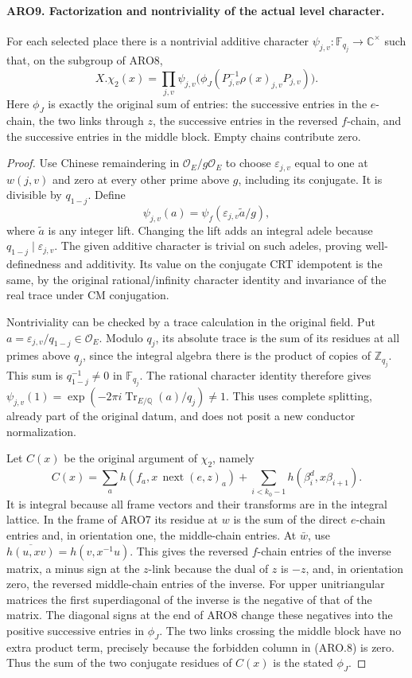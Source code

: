 \paragraph{ARO9. Factorization and nontriviality of the actual level character.}
\label{claim:ARO9}
For each selected place there is a nontrivial additive character
\(\psi_{j,v}:\mathbb F_{q_j}\to\mathbb C^\times\) such that, on
the subgroup of ARO8,
\[
 X.\chi_2(x)=\prod_{j,v}\psi_{j,v}
   \bigl(\phi_J(P_{j,v}^{-1}\rho(x)_{j,v}P_{j,v})\bigr).
 \tag{ARO.10}
\]
Here \(\phi_J\) is exactly the original sum of entries: the
successive entries in the \(e\)-chain, the two links through \(z\),
the successive entries in the reversed \(f\)-chain, and the
successive entries in the middle block.  Empty chains contribute zero.
\begin{proof}
Use Chinese remaindering in \(\mathcal O_E/g\mathcal O_E\) to
choose \(\varepsilon_{j,v}\) equal to one at \(w(j,v)\) and zero
at every other prime above \(g\), including its conjugate.
It is divisible by \(q_{1-j}\).  Define
\[
 \psi_{j,v}(a)=\psi_f(\varepsilon_{j,v}\widetilde a/g),
 \tag{ARO.11}
\]
where \(\widetilde a\) is any integer lift.  Changing the lift
adds an integral adele because \(q_{1-j}\mid\varepsilon_{j,v}\).
The given additive character is trivial on such adeles, proving
well-definedness and additivity.  Its value on the conjugate CRT
idempotent is the same, by the original rational/infinity character
identity and invariance of the real trace under CM conjugation.

Nontriviality can be checked by a trace calculation in the original
field.  Put \(a=\varepsilon_{j,v}/q_{1-j}\in\mathcal O_E\).
Modulo \(q_j\), its absolute trace is the sum of its residues at
all primes above \(q_j\), since the integral algebra there is the
product of copies of \(\mathbb Z_{q_j}\).  This sum is
\(q_{1-j}^{-1}\neq0\) in \(\mathbb F_{q_j}\).  The rational
character identity therefore gives
\(\psi_{j,v}(1)=\exp(-2\pi i\operatorname{Tr}_{E/\mathbb Q}(a)/q_j)
\neq1\).  This uses complete splitting, already part of the
original datum, and does not posit a new conductor normalization.

Let \(C(x)\) be the original argument of \(\chi_2\), namely
\[
 C(x)=\sum_a h(f_a,x\,\operatorname{next}(e,z)_a)
                 +\sum_{i<k_0-1}h(\beta_i^d,x\beta_{i+1}).
\]
It is integral because all frame vectors and their transforms are
in the integral lattice.  In the frame of ARO7 its residue at
\(w\) is the sum of the direct \(e\)-chain entries and, in
orientation one, the middle-chain entries.  At \(\bar w\), use
\(\overline{h(u,xv)}=h(v,x^{-1}u)\).  This gives the reversed
\(f\)-chain entries of the inverse matrix, a minus sign at the
\(z\)-link because the dual of \(z\) is \(-z\), and, in
orientation zero, the reversed middle-chain entries of the inverse.
For upper unitriangular matrices the first superdiagonal of the
inverse is the negative of that of the matrix.  The diagonal signs
at the end of ARO8 change these negatives into the positive
successive entries in \(\phi_J\).  The two links crossing the
middle block have no extra product term, precisely because the
forbidden column in (ARO.8) is zero.  Thus the sum of the two
conjugate residues of \(C(x)\) is the stated \(\phi_J\).


\end{proof}
